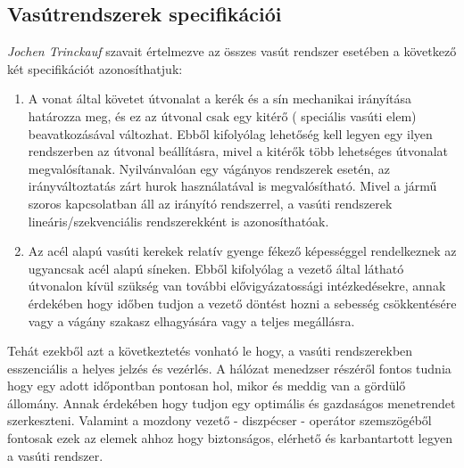 \documentclass[a4paper,12pt]{article}
\begin{document}
\subsection{Vasútrendszerek specifikációi}
\textit {Jochen Trinckauf} szavait értelmezve az összes vasút rendszer esetében a következő két specifikációt azonosíthatjuk:
\begin{enumerate}
    \item A vonat által követet útvonalat a kerék és a sín mechanikai irányítása határozza meg, és ez az útvonal csak egy kitérő ( speciális vasúti elem) beavatkozásával változhat.
	Ebből kifolyólag lehetőség kell legyen egy ilyen rendszerben az útvonal beállításra, mivel a kitérők több lehetséges útvonalat megvalósítanak. Nyilvánvalóan egy vágányos rendszerek esetén, az irányváltoztatás zárt hurok használatával is megvalósítható. 
    Mivel a jármű szoros kapcsolatban áll az irányító rendszerrel, a vasúti rendszerek lineáris/szekvenciális rendszerekként is azonosíthatóak. 
	\item Az acél alapú vasúti kerekek relatív gyenge fékező képességgel rendelkeznek az ugyancsak acél alapú síneken. 
	Ebből kifolyólag a vezető által látható útvonalon kívül szükség van további elővigyázatossági intézkedésekre, annak érdekében hogy időben tudjon a vezető döntést hozni a sebesség csökkentésére vagy a vágány szakasz elhagyására vagy a teljes megállásra.
\end{enumerate}
\par Tehát ezekből azt a következtetés vonható le hogy, a vasúti rendszerekben esszenciális a helyes jelzés és vezérlés. 
A hálózat menedzser részéről fontos tudnia hogy egy adott időpontban pontosan hol, mikor és meddig van a gördülő állomány.
Annak érdekében hogy tudjon egy optimális és gazdaságos menetrendet szerkeszteni. 
Valamint a mozdony vezető - diszpécser - operátor szemszögéből fontosak ezek az elemek ahhoz hogy biztonságos, elérhető és karbantartott legyen a vasúti rendszer.
\pagebreak
\end{document}
